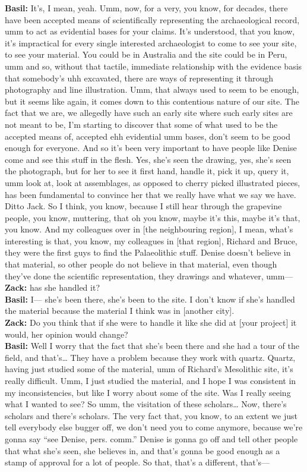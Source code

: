 \documentclass[
  canadian,
]{article}
\begin{document}
\textbf{Basil:} It's, I mean, yeah. Umm, now, for a very, you know, for
decades, there have been accepted means of scientifically representing
the archaeological record, umm to act as evidential bases for your
claims. It's understood, that you know, it's impractical for every
single interested archaeologist to come to see your site, to see your
material. You could be in Australia and the site could be in Peru, umm
and so, without that tactile, immediate relationship with the evidence
basis that somebody's uhh excavated, there are ways of representing it
through photography and line illustration. Umm, that always used to seem
to be enough, but it seems like again, it comes down to this contentious
nature of our site. The fact that we are, we allegedly have such an
early site where such early sites are not meant to be, I'm starting to
discover that some of what used to be the accepted means of, accepted
ehh evidential umm bases, don't seem to be good enough for everyone. And
so it's been very important to have people like Denise come and see this
stuff in the flesh. Yes, she's seen the drawing, yes, she's seen the
photograph, but for her to see it first hand, handle it, pick it up,
query it, umm look at, look at assemblages, as opposed to cherry picked
illustrated pieces, has been fundamental to convince her that we really
have what we say we have. Ditto Jack. So I think, you know, because I
still hear through the grapevine people, you know, muttering, that oh
you know, maybe it's this, maybe it's that, you know. And my colleagues
over in {[}the neighbouring region{]}, I mean, what's interesting is
that, you know, my colleagues in {[}that region{]}, Richard and Bruce,
they were the first guys to find the Palaeolithic stuff. Denise doesn't
believe in that material, so other people do not believe in that
material, even though they've done the scientific representation, they
drawings and whatever, umm---\\
\textbf{Zack:} has she handled it?\\
\textbf{Basil:} I--- she's been there, she's been to the site. I don't
know if she's handled the material because the material I think was in
{[}another city{]}.\\
\textbf{Zack:} Do you think that if she were to handle it like she did
at {[}your project{]} it would, her opinion would change?\\
\textbf{Basil:} Well I worry that the fact that she's been there and she
had a tour of the field, and that's\ldots{} They have a problem because
they work with quartz. Quartz, having just studied some of the material,
umm of Richard's Mesolithic site, it's really difficult. Umm, I just
studied the material, and I hope I was consistent in my inconsistencies,
but like I worry about some of the site. Was I really seeing what I
wanted to see? So umm, the visitation of these scholars\ldots{} Now,
there's scholars and there's scholars. The very fact that, you know, to
an extent we just tell everybody else bugger off, we don't need you to
come anymore, because we're gonna say ``see Denise, pers. comm.'' Denise
is gonna go off and tell other people that what she's seen, she believes
in, and that's gonna be good enough as a stamp of approval for a lot of
people. So that, that's a different, that's---
\end{document}
